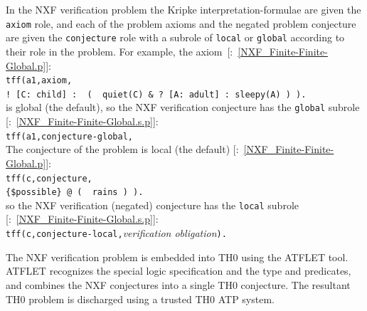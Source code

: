 \documentclass{ceurart}
\newcommand{\smalltt}[1]{\small \texttt{#1}}
\newcommand{\example}{{\scriptsize \faFile[regular]}}
\newcommand{\tildenot}{\raisebox{0.4ex}{\texttildelow}}
\begin{document}
In the NXF verification problem the Kripke interpretation-formulae are given the \smalltt{axiom} 
role, and each of the problem axioms and the negated problem conjecture are given the 
\smalltt{conjecture} role with a subrole of \smalltt{local} or \smalltt{global} according to 
their role in the problem.
For example, the axiom~[\example{}:~\ref{NXF_Finite-Finite-Global.p}]: \\
\hspace*{0.5cm}\smalltt{tff(a1,axiom,} \\
\hspace*{0.9cm}\smalltt{! [C: child] : \tildenot{}\,( \tildenot{}\,quiet(C) \& ? [A: adult] : sleepy(A) ) ).}\\
is global (the default), so the NXF verification conjecture has the \smalltt{global} subrole
[\example{}:~\ref{NXF_Finite-Finite-Global.s.p}]: \\
\hspace*{0.5cm}\smalltt{tff(a1,conjecture-global,} \\
The conjecture of the problem is local (the default) 
[\example{}:~\ref{NXF_Finite-Finite-Global.p}]: \\
\hspace*{0.5cm}\smalltt{tff(c,conjecture,} \\
\hspace*{0.9cm}\smalltt{\{\$possible\}\,@\,(\,\tildenot{}\,rains\,)\,).} \\
so the NXF verification (negated) conjecture has the \smalltt{local} subrole
[\example{}:~\ref{NXF_Finite-Finite-Global.s.p}]: \\
\hspace*{0.5cm}\smalltt{tff(c,conjecture-local,}\emph{verification obligation}\smalltt{).}

The NXF verification problem is embedded into TH0 using the ATFLET tool.
ATFLET recognizes the special logic specification and the type and predicates, and combines
the NXF conjectures into a single TH0 conjecture.
The resultant TH0 problem is discharged using a trusted TH0 ATP system.
\end{document}
